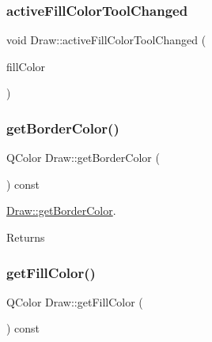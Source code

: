 \mbox{\label{class_draw_ac28b7e408c687ddfd85e01954109329d}} 
\subsubsection{\texorpdfstring{active\+Fill\+Color\+Tool\+Changed}{activeFillColorToolChanged}}
{\footnotesize\ttfamily void Draw\+::active\+Fill\+Color\+Tool\+Changed (\begin{DoxyParamCaption}\item[{Q\+Color}]{fill\+Color }\end{DoxyParamCaption})\hspace{0.3cm}{\ttfamily [signal]}}

\mbox{\label{class_draw_aa3700cc975270d70dcf18d4160d7f1e6}} 
\subsubsection{\texorpdfstring{get\+Border\+Color()}{getBorderColor()}}
{\footnotesize\ttfamily Q\+Color Draw\+::get\+Border\+Color (\begin{DoxyParamCaption}{ }\end{DoxyParamCaption}) const}



\hyperlink{class_draw_aa3700cc975270d70dcf18d4160d7f1e6}{Draw\+::get\+Border\+Color}. 

\begin{DoxyReturn}{Returns}

\end{DoxyReturn}
\mbox{\label{class_draw_a4be8a242b92fd9d5c42fe9a40810cdb6}} 
\subsubsection{\texorpdfstring{get\+Fill\+Color()}{getFillColor()}}
{\footnotesize\ttfamily Q\+Color Draw\+::get\+Fill\+Color (\begin{DoxyParamCaption}{ }\end{DoxyParamCaption}) const}



